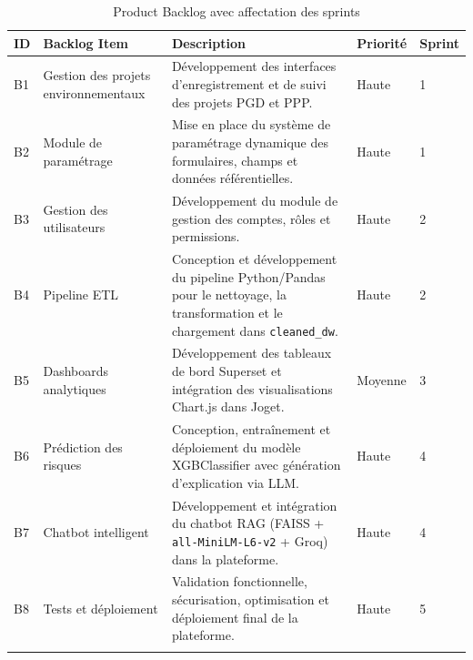 \vspace{0.4cm}

\begin{longtable}{|m{1.2cm}|m{3.8cm}|m{6.2cm}|m{2cm}|m{1.5cm}|}
\hline
\textbf{ID} & \textbf{Backlog Item} & \textbf{Description} &
\textbf{Priorité} & \textbf{Sprint} \\
\hline
\endhead

B1 & Gestion des projets environnementaux &
Développement des interfaces d'enregistrement et de suivi
des projets PGD et PPP. & Haute & 1 \\
\hline

B2 & Module de paramétrage &
Mise en place du système de paramétrage dynamique des formulaires,
champs et données référentielles. & Haute & 1 \\
\hline

B3 & Gestion des utilisateurs &
Développement du module de gestion des comptes, rôles et
permissions. & Haute & 2 \\
\hline

B4 & Pipeline ETL &
Conception et développement du pipeline Python/Pandas pour le
nettoyage, la transformation et le chargement dans
\texttt{cleaned\_dw}. & Haute & 2 \\
\hline

B5 & Dashboards analytiques &
Développement des tableaux de bord Superset et intégration des
visualisations Chart.js dans Joget. & Moyenne & 3 \\
\hline

B6 & Prédiction des risques &
Conception, entraînement et déploiement du modèle XGBClassifier
avec génération d'explication via LLM. & Haute & 4 \\
\hline

B7 & Chatbot intelligent &
Développement et intégration du chatbot RAG (FAISS +
\texttt{all-MiniLM-L6-v2} + Groq) dans la plateforme. & Haute & 4 \\
\hline

B8 & Tests et déploiement &
Validation fonctionnelle, sécurisation, optimisation et
déploiement final de la plateforme. & Haute & 5 \\
\hline

\captionsetup{justification=centering,margin=2cm}
\caption{Product Backlog avec affectation des sprints}
\label{tab:product_backlog}
\end{longtable}

\vspace{0.4cm}


